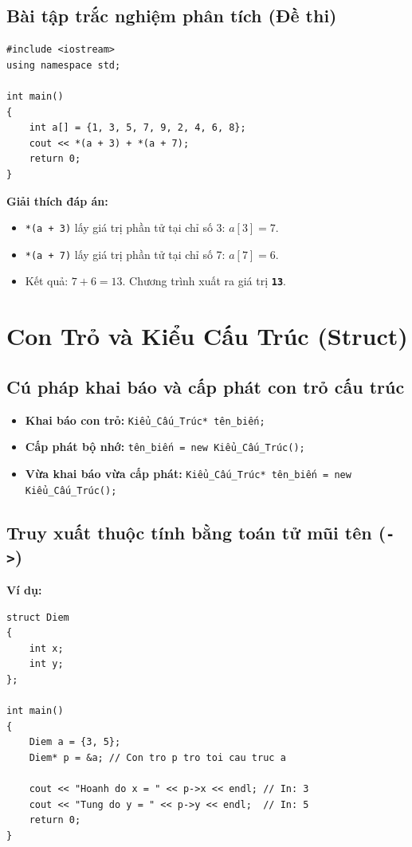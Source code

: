\documentclass[12pt,a4paper]{article}
\begin{document}
\subsection{Bài tập trắc nghiệm phân tích (Đề thi)}
\begin{lstlisting}
#include <iostream>
using namespace std;

int main()
{
    int a[] = {1, 3, 5, 7, 9, 2, 4, 6, 8};
    cout << *(a + 3) + *(a + 7);
    return 0;
}
\end{lstlisting}
\textbf{Giải thích đáp án:}
\begin{itemize}[itemsep=0.15em]
    \item \texttt{*(a + 3)} lấy giá trị phần tử tại chỉ số 3: $a[3] = 7$.
    \item \texttt{*(a + 7)} lấy giá trị phần tử tại chỉ số 7: $a[7] = 6$.
    \item Kết quả: $7 + 6 = 13$. Chương trình xuất ra giá trị \textbf{\texttt{13}}.
\end{itemize}

\section{Con Trỏ và Kiểu Cấu Trúc (Struct)}

\subsection{Cú pháp khai báo và cấp phát con trỏ cấu trúc}
\begin{itemize}[itemsep=0.15em]
    \item \textbf{Khai báo con trỏ:} \texttt{Kiểu\_Cấu\_Trúc* tên\_biến;}
    \item \textbf{Cấp phát bộ nhớ:} \texttt{tên\_biến = new Kiểu\_Cấu\_Trúc();}
    \item \textbf{Vừa khai báo vừa cấp phát:} \texttt{Kiểu\_Cấu\_Trúc* tên\_biến = new Kiểu\_Cấu\_Trúc();}
\end{itemize}

\subsection{Truy xuất thuộc tính bằng toán tử mũi tên (\texttt{->})}
\begin{center}
\end{center}
\textbf{Ví dụ:}
\begin{lstlisting}
struct Diem
{
    int x;
    int y;
};

int main()
{
    Diem a = {3, 5};
    Diem* p = &a; // Con tro p tro toi cau truc a

    cout << "Hoanh do x = " << p->x << endl; // In: 3
    cout << "Tung do y = " << p->y << endl;  // In: 5
    return 0;
}
\end{lstlisting}
\end{document}
